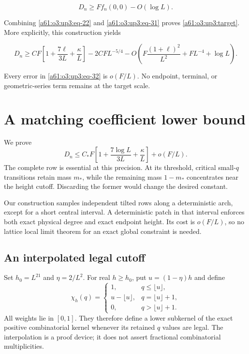 \documentclass[11pt,letterpaper]{article}
\numberwithin{equation}{section}
\theoremstyle{remark}\newtheorem{remark}[theorem]{Remark}
\begin{document}
\begin{equation}
D_n\ge Ff_n(0,0)-O(\log L).
\label{a61:o3:up3:eq-31}
\end{equation}

Combining \eqref{a61:o3:up3:eq-22} and \eqref{a61:o3:up3:eq-31} proves
\eqref{a61:o3:up3:target}. More explicitly, this construction yields

\begin{equation}
D_n\ge CF\left[1+\frac{7\ell}{3L}+\frac\kappa L\right]
 -2CF L^{-5/4}
 -O\!\left(F\frac{(1+\ell)^2}{L^2}+FL^{-4}+\log L\right).
\label{a61:o3:up3:eq-32}
\end{equation}

Every error in \eqref{a61:o3:up3:eq-32} is \(o(F/L)\). No endpoint, terminal,
or geometric-series term remains at the target scale.

\section{A matching coefficient lower bound}
\label{a61:o3:lo3:section}

We prove
\begin{equation}\label{a61:o3:lo3:target}
 D_n\le C_*F\left[1+\frac{7\log L}{3L}+\frac\kappa L\right]
                  +o(F/L).
\end{equation}
The complete row is essential at this precision. At its threshold,
critical small-$q$ transitions retain mass $m_*$, while the remaining
mass $1-m_*$ concentrates near the height cutoff. Discarding the
former would change the desired constant.

Our construction samples independent tilted rows along a deterministic
arch, except for a short central interval. A deterministic patch in
that interval enforces both exact physical degree and exact endpoint
height. Its cost is $o(F/L)$, so no lattice local limit theorem for
an exact global constraint is needed.

\subsection{An interpolated legal cutoff}

Set $h_0=L^{21}$ and $\eta=2/L^2$. For real $h\ge h_0$, put
$u=(1-\eta)h$ and define
\[
 \chi_h(q)=
 \begin{cases}
  1,&q\le\lfloor u\rfloor,\\
  u-\lfloor u\rfloor,&q=\lfloor u\rfloor+1,\\
  0,&q>\lfloor u\rfloor+1.
 \end{cases}
\]
All weights lie in $[0,1]$. They therefore define a lower subkernel of
the exact positive combinatorial kernel whenever its retained $q$
values are legal. The interpolation is a proof device; it does not
assert fractional combinatorial multiplicities.
\end{document}
